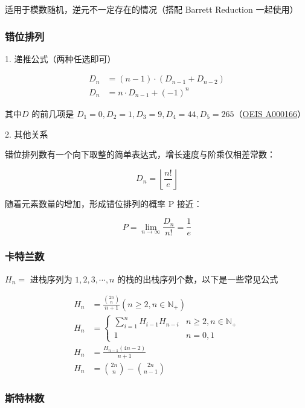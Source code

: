 \documentclass[12pt]{article}
\begin{document}
适用于模数随机，逆元不一定存在的情况（搭配 Barrett Reduction 一起使用）



\newpage

\subsubsection{错位排列}

1. 递推公式（两种任选即可）

$$
\begin{aligned}
	D_{n}&=(n-1)\cdot(D_{n-1}+D_{n-2})\\
	D_{n}&=n\cdot D_{n-1}+(-1)^{n}
\end{aligned}
$$

其中$D$ 的前几项是 $D_1=0, D_2=1, D_3=9, D_4=44, D_5=265 $（\href{http://oeis.org/A000166}{OEIS A000166}）

2. 其他关系

错位排列数有一个向下取整的简单表达式，增长速度与阶乘仅相差常数：

$$
D_n=\left\lfloor\frac{n!}{e}\right\rfloor
$$

随着元素数量的增加，形成错位排列的概率 P 接近：

$$
P=\lim_{n\to\infty}\frac{D_n}{n!}=\frac{1}{e}
$$

\subsubsection{卡特兰数}

$H_n=$ 进栈序列为 $1,2,3,\cdots,n$ 的栈的出栈序列个数，以下是一些常见公式

$$
\begin{aligned}
	H_{n}&=\frac{\binom{2n}{n}}{n+1}(n\ge2,n\in\mathbb{N}_{+})\\
	H_{n}&=
	\begin{cases}
		\sum_{i=1}^{n}H_{i-1}H_{n-i} & n\ge2,n\in\mathbb{N}_{+}\\
		1 & n=0,1
	\end{cases}\\
	H_{n}&=\frac{H_{n-1}(4n-2)}{n+1}\\
	H_{n}&=\binom{2n}{n}-\binom{2n}{n-1}
\end{aligned}
$$

\newpage

\subsubsection{斯特林数}
\end{document}
